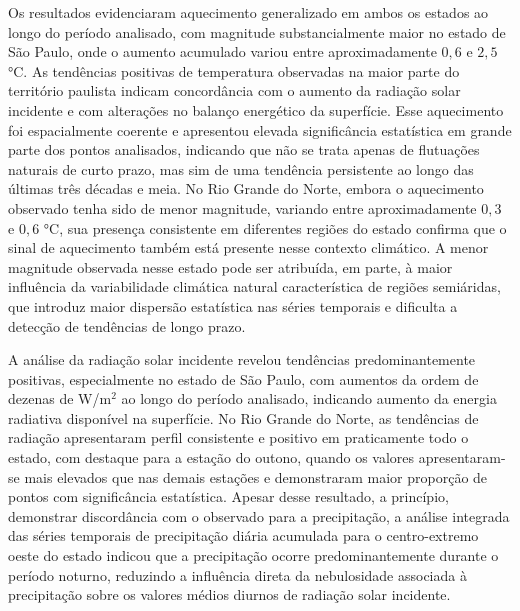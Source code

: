 Os resultados evidenciaram aquecimento generalizado em ambos os estados ao longo do período analisado, com magnitude substancialmente maior no estado de São Paulo, onde o aumento acumulado variou entre aproximadamente $0{,}6$ e $2{,}5$ °C. As tendências positivas de temperatura observadas na maior parte do território paulista indicam concordância com o aumento da radiação solar incidente e com alterações no balanço energético da superfície. Esse aquecimento foi espacialmente coerente e apresentou elevada significância estatística em grande parte dos pontos analisados, indicando que não se trata apenas de flutuações naturais de curto prazo, mas sim de uma tendência persistente ao longo das últimas três décadas e meia. No Rio Grande do Norte, embora o aquecimento observado tenha sido de menor magnitude, variando entre aproximadamente $0{,}3$ e $0{,}6$ °C, sua presença consistente em diferentes regiões do estado confirma que o sinal de aquecimento também está presente nesse contexto climático. A menor magnitude observada nesse estado pode ser atribuída, em parte, à maior influência da variabilidade climática natural característica de regiões semiáridas, que introduz maior dispersão estatística nas séries temporais e dificulta a detecção de tendências de longo prazo.

A análise da radiação solar incidente revelou tendências predominantemente positivas, especialmente no estado de São Paulo, com aumentos da ordem de dezenas de W/m$^2$ ao longo do período analisado, indicando aumento da energia radiativa disponível na superfície. No Rio Grande do Norte, as tendências de radiação apresentaram perfil consistente e positivo em praticamente todo o estado, com destaque para a estação do outono, quando os valores apresentaram-se mais elevados que nas demais estações e demonstraram maior proporção de pontos com significância estatística. Apesar desse resultado, a princípio, demonstrar discordância com o observado para a precipitação, a análise integrada das séries temporais de precipitação diária acumulada para o centro-extremo oeste do estado indicou que a precipitação ocorre predominantemente durante o período noturno, reduzindo a influência direta da nebulosidade associada à precipitação sobre os valores médios diurnos de radiação solar incidente.

